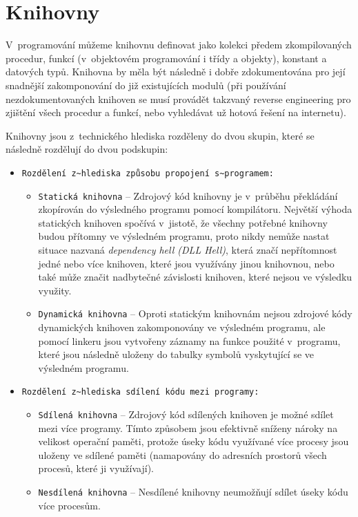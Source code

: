 \chapter{Knihovny}
V~programování můžeme knihovnu definovat jako kolekci předem zkompilovaných procedur, funkcí (v~objektovém programování i třídy a objekty), konstant a datových typů. Knihovna by měla být následně i dobře zdokumentována pro její snadnější zakomponování do již existujících modulů (při používání nezdokumentovaných knihoven se musí provádět takzvaný reverse engineering pro zjištění všech procedur a funkcí, nebo vyhledávat už hotová řešení na internetu). 
\par
Knihovny jsou z~technického hlediska rozděleny do dvou skupin, které se následně rozdělují do dvou podskupin:
	\begin{itemize}
	\item \verb|Rozdělení z~hlediska způsobu propojení s~programem:|
		\begin{itemize}
		\item \verb|Statická knihovna| -- Zdrojový kód knihovny je v~průběhu překládání zkopírován do výsledného programu pomocí kompilátoru. Největší výhoda statických knihoven spočívá v~jistotě, že všechny potřebné knihovny budou přítomny ve výsledném programu, proto nikdy nemůže nastat situace nazvaná \textit{dependency hell (DLL Hell)}, která značí nepřítomnost jedné nebo více knihoven, které jsou využívány jinou knihovnou, nebo také může značit nadbytečné závislosti knihoven, které nejsou ve výsledku využity.
		\item \verb|Dynamická knihovna| -- Oproti statickým knihovnám nejsou zdrojové kódy dynamických knihoven zakomponovány ve výsledném programu, ale pomocí linkeru jsou vytvořeny záznamy na funkce použité v~programu, které jsou následně uloženy do tabulky symbolů vyskytující se ve výsledném programu.
		\end{itemize}
	\item \verb|Rozdělení z~hlediska sdílení kódu mezi programy:|
		\begin{itemize}
		\item \verb|Sdílená knihovna| -- Zdrojový kód sdílených knihoven je možné sdílet mezi více programy. Tímto způsobem jsou efektivně sníženy nároky na velikost operační paměti, protože úseky kódu využívané více procesy jsou uloženy ve sdílené paměti (namapovány do adresních prostorů všech procesů, které ji využívají).
		\item \verb|Nesdílená knihovna| -- Nesdílené knihovny neumožňují sdílet úseky kódu více procesům.
		\end{itemize}
	\end{itemize}
